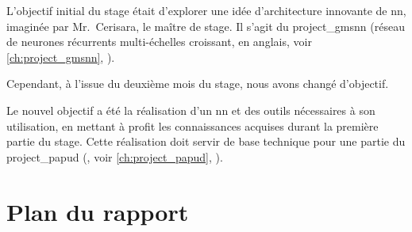 L'objectif initial du stage était d'explorer une idée d'architecture innovante de \gls{nn}, imaginée par Mr.~Cerisara, le maître de stage. Il s'agit du \gls{project_gmsnn} (réseau de neurones récurrents multi-échelles croissant,  en anglais, voir \autoref{ch:project_gmsnn}, ).

Cependant, à l'issue du deuxième mois du stage, nous avons changé d'objectif.

Le nouvel objectif a été la réalisation d'un \gls{nn} et des outils nécessaires à son utilisation, en mettant à profit les connaissances acquises durant la première partie du stage.
Cette réalisation doit servir de base technique pour une partie du \gls{project_papud} (, voir \autoref{ch:project_papud}, ).


%

\section[Plan]{Plan du rapport}

